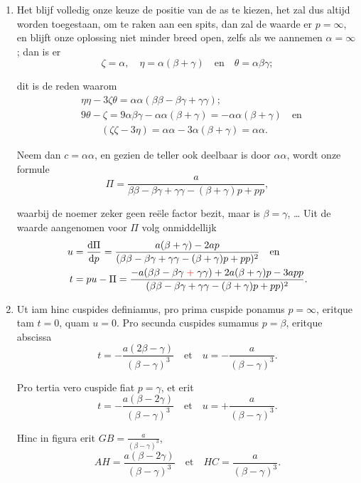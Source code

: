 \documentclass[10pt,a4paper]{article}
\newcommand{\switchenum}{\setcounter{enumi}{\arabic{enumi}-1}\switchcolumn}
\def\D{\mathrm{d}}
\begin{document}
\begin{paracol}{2}
\begin{enumerate}[topsep=1px]
		\switchenum
		\item Het blijf volledig onze keuze de positie van de as te kiezen, het zal dus altijd worden toegestaan, om te raken aan een spits, dan zal de waarde er $p=\infty$, en blijft onze oplossing niet minder breed open, zelfs als we aannemen $\alpha = \infty$; dan is er
		\[
			\zeta = \alpha, \quad \eta = \alpha(\beta+ \gamma)\quad \text{en}\quad  \theta = \alpha \beta \gamma;
		\]
		\par dit is de reden waarom
		\begin{align*}
			&\eta \eta - 3\zeta \theta = \alpha \alpha (\beta \beta - \beta \gamma + \gamma \gamma);\\
			&9\theta - \zeta = 9\alpha \beta \gamma - \alpha \alpha(\beta + \gamma) = - \alpha \alpha (\beta + \gamma)\quad \text{en}\\
			&\qquad (\zeta \zeta - 3\eta) = \alpha \alpha - 3\alpha (\beta + \gamma) = \alpha \alpha.
		\end{align*}
		\par Neem dan $c= \alpha \alpha$, en gezien de teller ook deelbaar is door $\alpha\alpha$, wordt onze formule
		\[
			\Pi = \frac{a}{\beta \beta -\beta \gamma+\gamma \gamma -(\beta + \gamma)p + pp},
		\]
		\par waarbij de noemer zeker geen reële factor bezit, maar is $\beta = \gamma$, \ldots
		Uit de waarde aangenomen voor $\Pi$ volg onmiddellijk
		\begin{align*}
			u &= \frac{\D \Pi}{\D p} = \frac{a(\beta + \gamma)-2ap}{(\beta \beta -\beta \gamma +\gamma \gamma - (\beta+\gamma)p+pp)^2} \quad \text{en}\\
			t & = pu - \Pi = \frac{-a(\beta \beta - \beta \gamma\;{\color{red}+}\;\gamma \gamma)+2a(\beta+\gamma)p -3app}{(\beta \beta - \beta \gamma + \gamma \gamma -(\beta + \gamma)p+pp)^2}.
		\end{align*}
		\switchcolumn*
		
		\item Ut iam hinc cuspides definiamus, pro prima cuspide ponamus $p = \infty$, eritque tam $t= 0$, quam $u=0$. Pro secunda cuspides sumamus $p=\beta$, eritque abscissa
		\[
			t = -\frac{a(2\beta- \gamma)}{(\beta - \gamma)^3} \quad \text{et} \quad u = - \frac{a}{(\beta-\gamma)^3}.
		\]
		\par Pro tertia vero cuspide fiat $p=\gamma$, et erit
		\[
			t = -\frac{a(\beta - 2\gamma)}{(\beta-\gamma)^3} \quad \text{et}\quad u = +\frac{a}{(\beta-\gamma)^3}.
		\]
		\par Hinc in figura erit $GB = \frac{a}{(\beta - \gamma)^3}$,
		\[
			AH = \frac{a(\beta - 2\gamma)}{(\beta - \gamma)^3} \quad \text{et}\quad HC = \frac{a}{(\beta - \gamma)^3}.
		\]
		

\end{enumerate}
\end{paracol}
\end{document}
